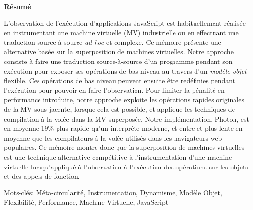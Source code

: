 
\begin{center}
\textbf{\large R\'esum\'e}
\end{center}


\vspace{1cm}

L'observation de l'ex\'ecution d'applications JavaScript est habituellement
r\'ealis\'ee en instrumentant une machine virtuelle (MV) industrielle ou en
effectuant une traduction source-\`a-source \textit{ad hoc} et complexe. Ce
m\'emoire pr\'esente une alternative bas\'ee sur la superposition de machines
virtuelles. Notre approche consiste \`a faire une traduction source-\`a-source d'un
programme pendant son ex\'ecution pour exposer ses op\'erations de bas niveau au
travers d'un \emph{mod\`ele objet} flexible. Ces op\'erations de bas niveau peuvent
ensuite \^etre red\'efinies pendant l'ex\'ecution pour pouvoir en faire l'observation.
Pour limiter la p\'enalit\'e en performance introduite, notre approche exploite les
op\'erations rapides originales de la MV sous-jacente, lorsque cela est possible,
et applique les techniques de compilation \`a-la-vol\'ee dans la MV superpos\'ee.
Notre impl\'ementation, Photon, est en moyenne 19\% plus rapide qu'un interpr\`ete
moderne, et entre  et  plus lente en moyenne que les
compilateurs \`a-la-vol\'ee utilis\'es dans les navigateurs web populaires. Ce
m\'emoire montre donc que la superposition de machines virtuelles est une
technique alternative comp\'etitive \`a l'instrumentation d'une machine virtuelle
lorsqu'appliqu\'e \`a l'observation \`a l'ex\'ecution des op\'erations sur les objets et
des appels de fonction.

Mots-cl\'es: M\'eta-circularit\'e, Instrumentation, Dynamisme, Mod\`ele Objet,
Flexibilit\'e, Performance, Machine Virtuelle, JavaScript  
